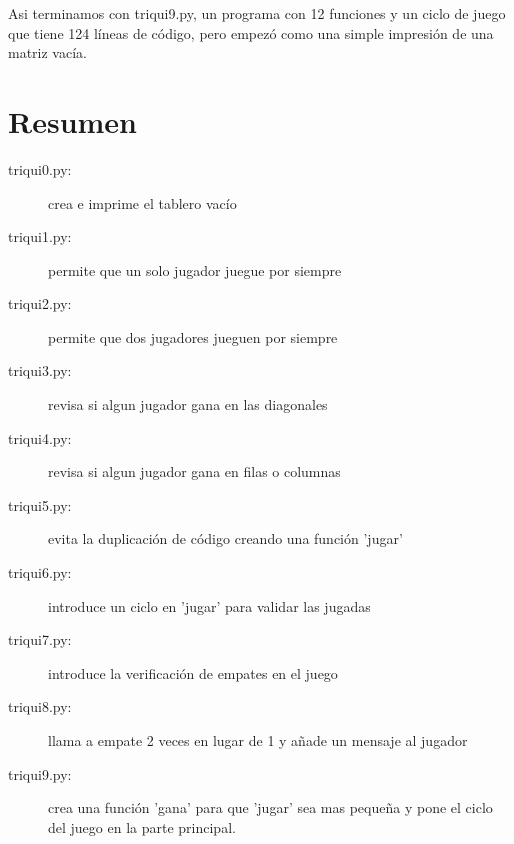 Asi terminamos con triqui9.py, un programa con 12 funciones y un ciclo de juego que
tiene 124 líneas de código, pero empezó como una simple impresión de una matriz 
vacía.

\section{Resumen}

\begin{description}
\item[triqui0.py:] crea e imprime el tablero vacío
\item[triqui1.py:] permite que un solo jugador juegue por siempre
\item[triqui2.py:] permite que dos jugadores jueguen por siempre
\item[triqui3.py:] revisa si algun jugador gana en las diagonales
\item[triqui4.py:] revisa si algun jugador gana en filas o columnas
\item[triqui5.py:] evita la duplicación de código creando una función 'jugar'
\item[triqui6.py:] introduce un ciclo en 'jugar' para validar las jugadas 
\item[triqui7.py:] introduce la verificación de empates en el juego
\item[triqui8.py:] llama a empate 2 veces en lugar de 1 y añade un mensaje al jugador
\item[triqui9.py:] crea una función 'gana' para que 'jugar' sea mas pequeña y pone el ciclo 
            del juego en la parte principal.
            
\end{description}